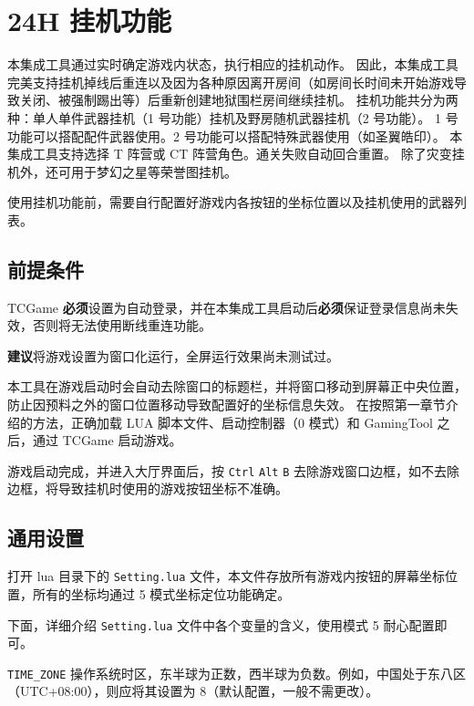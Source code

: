 \section{24H 挂机功能}

本集成工具通过实时确定游戏内状态，执行相应的挂机动作。
因此，本集成工具完美支持挂机掉线后重连以及因为各种原因离开房间（如房间长时间未开始游戏导致关闭、被强制踢出等）后重新创建地狱围栏房间继续挂机。
挂机功能共分为两种：单人单件武器挂机（1 号功能）挂机及野房随机武器挂机（2 号功能）。
1 号功能可以搭配配件武器使用。2 号功能可以搭配特殊武器使用（如圣翼皓印）。
本集成工具支持选择 T 阵营或 CT 阵营角色。通关失败自动回合重置。
除了灾变挂机外，还可用于梦幻之星等荣誉图挂机。

使用挂机功能前，需要自行配置好游戏内各按钮的坐标位置以及挂机使用的武器列表。

\subsection{前提条件}

TCGame \textbf{必须}设置为自动登录，并在本集成工具启动后\textbf{必须}保证登录信息尚未失效，否则将无法使用断线重连功能。

\textbf{建议}将游戏设置为窗口化运行，全屏运行效果尚未测试过。

本工具在游戏启动时会自动去除窗口的标题栏，并将窗口移动到屏幕正中央位置，防止因预料之外的窗口位置移动导致配置好的坐标信息失效。
在按照第一章节介绍的方法，正确加载 LUA 脚本文件、启动控制器（0 模式）和 GamingTool 之后，通过 TCGame 启动游戏。

游戏启动完成，并进入大厅界面后，按 \lstinline{Ctrl} \lstinline{Alt} \lstinline{B} 去除游戏窗口边框，如不去除边框，将导致挂机时使用的游戏按钮坐标不准确。

\subsection{通用设置}

打开 lua 目录下的 \lstinline{Setting.lua} 文件，本文件存放所有游戏内按钮的屏幕坐标位置，所有的坐标均通过 5 模式坐标定位功能确定。

下面，详细介绍 \lstinline{Setting.lua} 文件中各个变量的含义，使用模式 5 耐心配置即可。

\lstinline{TIME_ZONE} 操作系统时区，东半球为正数，西半球为负数。例如，中国处于东八区（UTC+08:00），则应将其设置为 8（默认配置，一般不需更改）。

